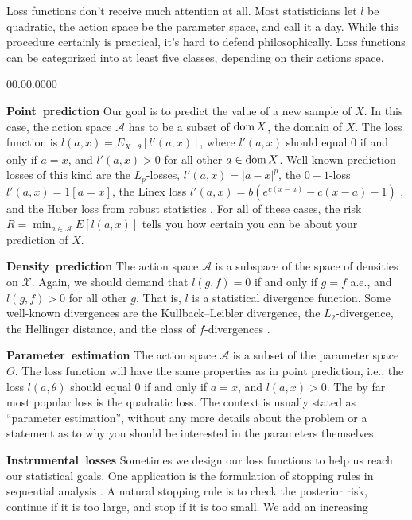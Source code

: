 Loss functions don't receive much attention at all. Most statisticians
let $l$ be quadratic, the action space be the parameter space, and
call it a day. While this procedure certainly is practical, it's hard
to defend philosophically. Loss functions can be categorized into
at least five classes, depending on their actions space.
\begin{lyxlist}{00.00.0000}
\item [{\textbf{Point~prediction}}] Our goal is to predict the value of
a new sample of $X$. In this case, the action space $\mathcal{A}$
has to be a subset of $\operatorname{dom} X$, the domain of $X$. The loss function
is $l(a,x)=E_{X\mid\theta}[l'(a,x)]$, where $l'(a,x)$ should equal
$0$ if and only if $a=x$, and $l'(a,x)>0$ for all other $a\in\operatorname{dom} X$.
Well-known prediction losses of this kind are the $L_{p}$-losses,
$l'(a,x)=|a-x|^{p}$, the $0-1$-loss $l'(a,x)=1[a=x]$, the Linex
loss $l'(a,x)=b(e^{c(x-a)}-c(x-a)-1)$ , and
the Huber loss from robust statistics . For all
of these cases, the risk $R=\min_{a\in\mathcal{A}}E[l(a,x)]$ tells
you how certain you can be about your prediction of $X$.
\item [{\textbf{Density~prediction}}] The action space $\mathcal{A}$
is a subspace of the space of densities on $\mathcal{X}$. Again,
we should demand that $l(g,f)=0$ if and only if $g=f$ a.e., and
$l(g,f)>0$ for all other $g$. That is, $l$ is a statistical divergence
function. Some well-known divergences are the Kullback--Leibler divergence,
the $L_{2}$-divergence, the Hellinger distance, and the class of
$f$-divergences . 
\item [{\textbf{Parameter~estimation}}] The action space $\mathcal{A}$
is a subset of the parameter space $\Theta$. The loss function will
have the same properties as in point prediction, i.e., the loss $l(a,\theta)$
should equal $0$ if and only if $a=x$, and $l(a,x)>0$. The by far
most popular loss is the quadratic loss. The context is usually stated
as ``parameter estimation'', without any more details about the
problem or a statement as to why you should be interested in the parameters
themselves.
\item [{\textbf{Instrumental~losses}}] Sometimes we design our loss functions
to help us reach our statistical goals. One application is the formulation
of stopping rules in sequential analysis .
A natural stopping rule is to check the posterior risk, continue if
it is too large, and stop if it is too small. We add an increasing

\end{lyxlist}

